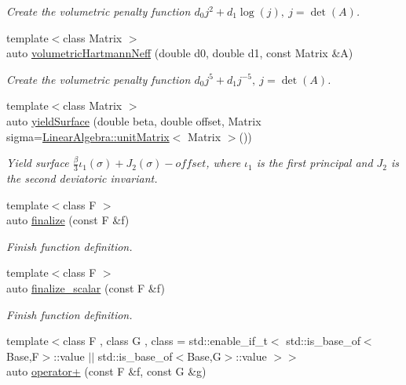 \begin{DoxyCompactItemize}
\begin{DoxyCompactList}\small\item\em Create the volumetric penalty function $ d_0 j^2 + d_1 \log(j),\ j=\det(A) $. \end{DoxyCompactList}\item 
{\footnotesize template$<$class Matrix $>$ }\\auto \hyperlink{namespaceFunG_adf4be5df85ea9df10cc9e11c11aaeb7b}{volumetric\+Hartmann\+Neff} (double d0, double d1, const Matrix \&A)
\begin{DoxyCompactList}\small\item\em Create the volumetric penalty function $ d_0 j^5 + d_1 j^{-5},\ j=\det(A) $. \end{DoxyCompactList}\item 
{\footnotesize template$<$class Matrix $>$ }\\auto \hyperlink{namespaceFunG_a4784211358c877f05ad9426850303273}{yield\+Surface} (double beta, double offset, Matrix sigma=\hyperlink{group__LinearAlgebraGroup_ga88a596b8526c0ed98ce241244fb85948}{Linear\+Algebra\+::unit\+Matrix}$<$ Matrix $>$())
\begin{DoxyCompactList}\small\item\em Yield surface $ \frac{\beta}{3}\iota_1(\sigma) + J_2(\sigma)-offset $, where $\iota_1$ is the first principal and $J_2$ is the second deviatoric invariant. \end{DoxyCompactList}\item 
{\footnotesize template$<$class F $>$ }\\auto \hyperlink{namespaceFunG_a3a2af76439713dc7635e0c538ac34f15}{finalize} (const F \&f)
\begin{DoxyCompactList}\small\item\em Finish function definition. \end{DoxyCompactList}\item 
{\footnotesize template$<$class F $>$ }\\auto \hyperlink{namespaceFunG_a0c224cd9b212427657c6798ac8adf6ac}{finalize\+\_\+scalar} (const F \&f)
\begin{DoxyCompactList}\small\item\em Finish function definition. \end{DoxyCompactList}\item 
{\footnotesize template$<$class F , class G , class  = std\+::enable\+\_\+if\+\_\+t$<$ std\+::is\+\_\+base\+\_\+of$<$\+Base,\+F$>$\+::value $\vert$$\vert$                                      std\+::is\+\_\+base\+\_\+of$<$\+Base,\+G$>$\+::value $>$$>$ }\\auto \hyperlink{namespaceFunG_ac7f61d48ff610ec4be8ee6994d165077}{operator+} (const F \&f, const G \&g)

\end{DoxyCompactItemize}
